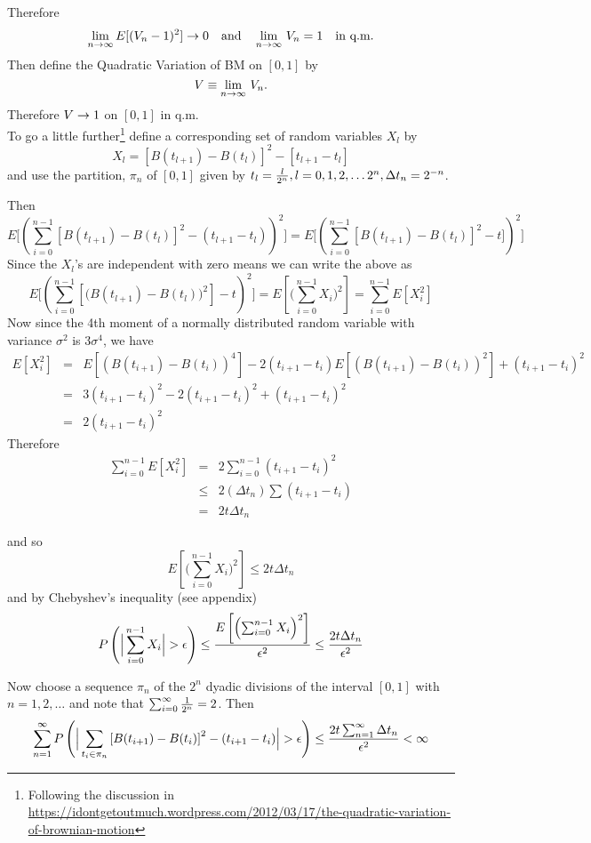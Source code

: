 Therefore $$\lim_{n\rightarrow\infty} E[(V_n - 1)^2]  \rightarrow 0\quad\hbox{and}\quad\lim_{n\rightarrow\infty}\, V_n = 1\quad\hbox{in q.m.}$$
Then define the Quadratic Variation of BM on $[0,1]$ by $$V \equiv \lim_{n\rightarrow\infty}\, V_n.$$ Therefore $V\rightarrow1$ on $[0,1]$ in q.m.\\

To go a little further\footnote{Following the discussion in \url{https://idontgetoutmuch.wordpress.com/2012/03/17/the-quadratic-variation-of-brownian-motion}} define a corresponding set of random variables $X_l$ by
$$X_l = \left[ B(t_{l+1}) - B(t_l)\right]^2 - [t_{l+1} - t_l]$$ and use the partition, $\pi_n$ of $[0,1]$ given by $t_l = {l\over2^n}, l = 0,1,2,\hdots 2^n,  \Delta t_n =  2^{-n}$.

Then $$E\Big[ \left( \sum_{i=0}^{n-1} \left[ B(t_{l+1}) - B(t_l)\right]^2 - (t_{l+1} - t_l) \right)^2\Big] = E\Big[ \left( \sum_{i=0}^{n-1} \left[ B(t_{l+1}) - B(t_l)\right]^2 - t]\right)^2\Big]$$ 
Since the $X_l$'s are independent with zero means we can write the above as
$$E\Big[ \left( \sum_{i=0}^{n-1} \left[ \big(B(t_{l+1}) - B(t_l)\big)^2\right] - t \right)^2\Big] = E\left[\Big(\sum_{i=0}^{n-1} X_i \Big)^2\right] = \sum_{i=0}^{n-1}E[X_i^2] $$
Now since the 4th moment of a normally distributed random variable with variance $\sigma^2$ is $3\sigma^4$, we have
\begin{eqnarray*}
E[X_i^2] &=& E[ ( B(t_{i+1}) - B(t_i) )^4] -2(t_{i+1} - t_i)E[ (B(t_{i+1}) - B(t_i) )^2] + (t_{i+1} - t_i)^2\\
&=& 3(t_{i+1} - t_i)^2 - 2(t_{i+1} - t_i)^2 + (t_{i+1} - t_i)^2 \\
&=& 2(t_{i+1} - t_i)^2
\end{eqnarray*}
Therefore 
\begin{eqnarray*}
\sum_{i=0}^{n-1} E[X_i^2] &=& 2\sum_{i=0}^{n-1} (t_{i+1} - t_i)^2 \\
&\le&2(\Delta t_n) \sum (t_{i+1} - t_i) \\
&=& 2t\Delta t_n
\end{eqnarray*}

and so $$E\left[ \Big( \sum_{i=0}^{n-1} X_i \Big)^2 \right] \le 2t\Delta t_n$$ and by Chebyshev's inequality (see appendix) 
$$P\left(\Big| \sum_{i=0}^{n-1} X_i \Big| > \epsilon \right) \le {E\left[  \left( \sum_{i=0}^{n-1} X_i \right)^2 \right] \over \epsilon^2} \le {2t\Delta t_n \over \epsilon^2} $$

Now choose a sequence $\pi_n$ of the $2^n$ dyadic divisions of the interval $[0,1]$ with $n=1,2,\hdots$ and note that $\sum_{i=0}^\infty {1\over2^n} = 2$. Then
$$\sum_{n=1}^\infty P\left(\Big| \sum_{t_i \in \pi_n} \left[ B(t_{i+1}) - B(t_i)\right]^2 - (t_{i+1} - t_i)\Big| > \epsilon \right) \le   {2t\sum_{n=1}^\infty \Delta t_n \over \epsilon^2} < \infty$$
   

